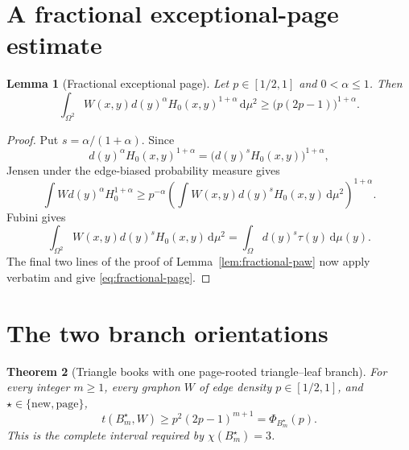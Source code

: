 \documentclass[11pt]{article}
\newtheorem{theorem}{Theorem}[section]
\newtheorem{lemma}[theorem]{Lemma}
\newcommand{\dd}{\,\mathrm d}
\begin{document}
\section{A fractional exceptional-page estimate}

\begin{lemma}[Fractional exceptional page]
\label{lem:fractional-page}
Let $p\in[1/2,1]$ and $0<\alpha\leq1$.  Then
\begin{equation}
 \int_{\Omega^2}W(x,y)d(y)^\alpha H_0(x,y)^{1+\alpha}\dd\mu^2
 \geq \bigl(p(2p-1)\bigr)^{1+\alpha}.
 \label{eq:fractional-page}
\end{equation}
\end{lemma}

\begin{proof}
Put $s=\alpha/(1+\alpha)$.  Since
\[
 d(y)^\alpha H_0(x,y)^{1+\alpha}
 =\bigl(d(y)^sH_0(x,y)\bigr)^{1+\alpha},
\]
Jensen under the edge-biased probability measure gives
\[
 \int Wd(y)^\alpha H_0^{1+\alpha}
 \geq p^{-\alpha}
 \left(\int W(x,y)d(y)^sH_0(x,y)\dd\mu^2\right)^{1+\alpha}.
\]
Fubini gives
\[
 \int_{\Omega^2}W(x,y)d(y)^sH_0(x,y)\dd\mu^2
 =\int_\Omega d(y)^s\tau(y)\dd\mu(y).
\]
The final two lines of the proof of Lemma~\ref{lem:fractional-paw} now
apply verbatim and give \eqref{eq:fractional-page}.
\end{proof}


\section{The two branch orientations}

\begin{theorem}[Triangle books with one page-rooted triangle--leaf branch]
\label{thm:main}
For every integer $m\geq1$, every graphon $W$ of edge density
$p\in[1/2,1]$, and $\star\in\{\mathrm{new},\mathrm{page}\}$,
\[
 \boxed{
 t(B_m^\star,W)\geq p^2(2p-1)^{m+1}
 =\Phi_{B_m^\star}(p).
 }
\]
This is the complete interval required by $\chi(B_m^\star)=3$.
\end{theorem}
\end{document}
